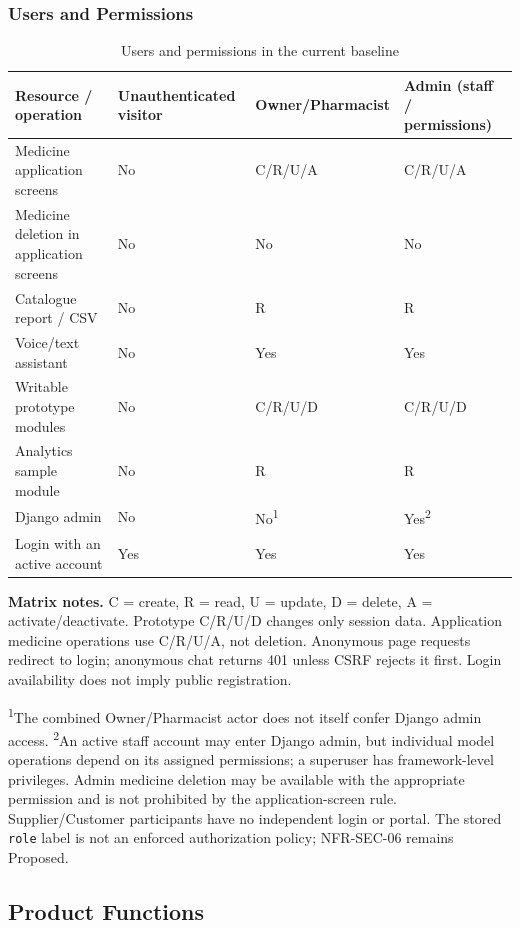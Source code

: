 \documentclass{article}
\begin{document}
\subsubsection{Users and Permissions}
\begin{table}[H]\centering\small
\caption{Users and permissions in the current baseline}\label{tab:permissions}
\begin{tabularx}{\textwidth}{@{}L{56mm}YYY@{}}
\toprule Resource / operation & Unauthenticated visitor & Owner/Pharmacist & Admin (staff / permissions)\\\midrule
Medicine application screens & No & C/R/U/A & C/R/U/A\\
Medicine deletion in application screens & No & No & No\\
Catalogue report / CSV & No & R & R\\
Voice/text assistant & No & Yes & Yes\\
Writable prototype modules & No & C/R/U/D & C/R/U/D\\
Analytics sample module & No & R & R\\
Django admin & No & No\textsuperscript{1} & Yes\textsuperscript{2}\\
Login with an active account & Yes & Yes & Yes\\
\bottomrule\end{tabularx}
\end{table}
\textbf{Matrix notes.} C = create, R = read, U = update, D = delete, A = activate/deactivate. Prototype C/R/U/D changes only session data. Application medicine operations use C/R/U/A, not deletion. Anonymous page requests redirect to login; anonymous chat returns 401 unless CSRF rejects it first. Login availability does not imply public registration.

\textsuperscript{1}The combined Owner/Pharmacist actor does not itself confer Django admin access. \textsuperscript{2}An active staff account may enter Django admin, but individual model operations depend on its assigned permissions; a superuser has framework-level privileges. Admin medicine deletion may be available with the appropriate permission and is not prohibited by the application-screen rule. Supplier/Customer participants have no independent login or portal. The stored \texttt{role} label is not an enforced authorization policy; NFR-SEC-06 remains Proposed.

\subsection{Product Functions}
\end{document}
